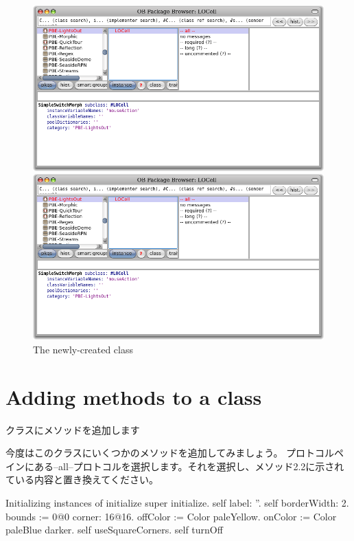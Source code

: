 \documentclass[a4paper,10pt,twoside]{book}
\begin{document}
\begin{figure}[h!t]
\ifluluelse
	{\centerline {\includegraphics[width=\textwidth]{LOCell}}}
	{\centerline {\includegraphics[scale=0.7]{LOCell}}}
\caption{The newly-created class }
\end{figure}

\section{Adding methods to a class}

クラスにメソッドを追加します

今度はこのクラスにいくつかのメソッドを追加してみましょう。
プロトコルペインにある--all--プロトコルを選択します。それを選択し、メソッド2.2に示されている内容と置き換えてください。

\begin{numMethod}[scbecellinitialize]{Initializing instances of }
initialize
   super initialize.
   self label: ''.
   self borderWidth: 2.
   bounds := 0@0 corner: 16@16.
   offColor := Color paleYellow.
   onColor := Color paleBlue darker.
   self useSquareCorners.
   self turnOff
\end{numMethod}
\end{document}

